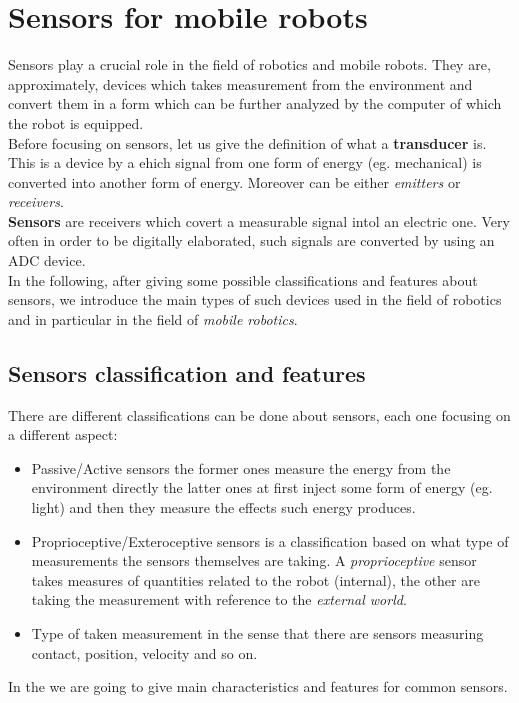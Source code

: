 \section{Sensors for mobile robots}
Sensors play a crucial role in the field of robotics and mobile robots. They are, approximately, devices which takes measurement from the environment and convert them in a form which can be further analyzed by the computer of which the robot is equipped.\\
Before focusing on sensors, let us give the definition of what a \textbf{transducer} is. This is a device by a ehich signal from one form of energy (eg. mechanical) is converted into another form of energy. Moreover can be either \textit{emitters} or \textit{receivers}.\\
\textbf{Sensors} are receivers which covert a measurable signal intol an electric one. Very often in order to be digitally elaborated, such signals are converted by using an ADC device.\\

In the following, after giving some possible classifications and features about sensors, we introduce the main types of such devices used in the field of robotics and in particular in the field of \textit{mobile robotics}.

\subsection{Sensors classification and features}
There are different classifications can be done about sensors, each one focusing on a different aspect:
\begin{itemize}
    \itemsep-0.3em
    \item \textsf{Passive/Active sensors} the former ones measure the energy from the environment directly the latter ones at first inject some form of energy (eg. light) and then they measure the effects such energy produces.
    \item \textsf{Proprioceptive/Exteroceptive sensors} is a classification based on what type of measurements the sensors themselves are taking. A \textit{proprioceptive} sensor takes measures of quantities related to the robot (internal), the other are taking the measurement with reference to the \textit{external world}.
    \item \textsf{Type of taken measurement} in the sense that there are sensors measuring contact, position, velocity and so on.
\end{itemize}
In the  we are going to give main characteristics and features for common sensors.

